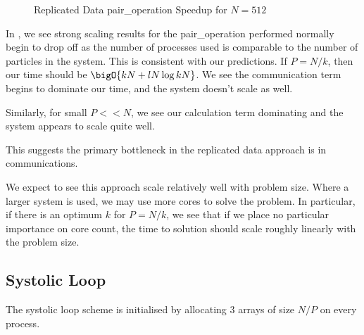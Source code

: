 \begin{figure}
    \label{fig:v0_replicated_512_logspeedup}
    
    \caption{Replicated Data pair\_operation Speedup for $N = 512$}
\end  {figure}

In , we see strong scaling results
for the pair\_operation performed normally begin to drop off as the number
of processes used is comparable to the number of particles in the system.
%
This is consistent with our predictions.
%
If $P = N/k$, then our time should be $\bigO{kN + lN\log{kN}}$.
%
We see the communication term begins to dominate our time, and
the system doesn't scale as well.

Similarly, for small $P << N$, we see our calculation term dominating
and the system appears to scale quite well.

This suggests the primary bottleneck in the replicated data approach
is in communications.

We expect to see this approach scale relatively well
with problem size.
%
Where a larger system is used, we may use more cores to solve the problem.
%
In particular, if there is an optimum $k$ for $P = N/k$, we see that
if we place no particular importance on core count, the time to solution
should scale roughly linearly with the problem size.




\subsection{Systolic Loop}

The systolic loop scheme is initialised by allocating 3 arrays of
size $N/P$ on every process.

